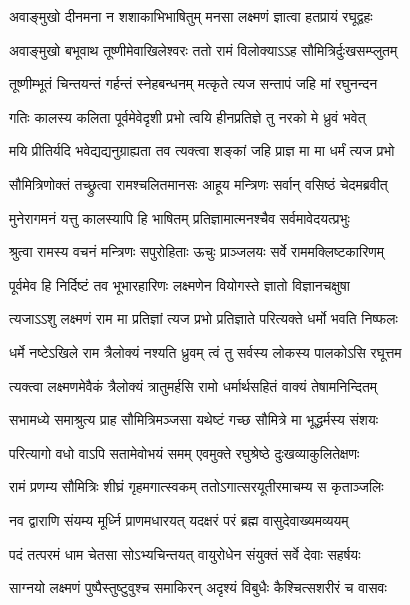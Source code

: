 \twolineshloka
{अवाङ्मुखो दीनमना न शशाकाभिभाषितुम्}
{मनसा लक्ष्मणं ज्ञात्वा हतप्रायं रघूद्वहः} %

\twolineshloka
{अवाङ्मुखो बभूवाथ तूष्णीमेवाखिलेश्वरः}
{ततो रामं विलोक्याऽऽह सौमित्रिर्दुःखसम्प्लुतम्} %

\twolineshloka
{तूष्णीम्भूतं चिन्तयन्तं गर्हन्तं स्नेहबन्धनम्}
{मत्कृते त्यज सन्तापं जहि मां रघुनन्दन} %

\twolineshloka
{गतिः कालस्य कलिता पूर्वमेवेदृशी प्रभो}
{त्वयि हीनप्रतिज्ञे तु नरको मे ध्रुवं भवेत्} %

\twolineshloka
{मयि प्रीतिर्यदि भवेद्यद्यनुग्राह्यता तव}
{त्यक्त्वा शङ्कां जहि प्राज्ञ मा मा धर्मं त्यज प्रभो} %

\twolineshloka
{सौमित्रिणोक्तं तच्छ्रुत्वा रामश्चलितमानसः}
{आहूय मन्त्रिणः सर्वान् वसिष्ठं चेदमब्रवीत्} %

\twolineshloka
{मुनेरागमनं यत्तु कालस्यापि हि भाषितम्}
{प्रतिज्ञामात्मनश्चैव सर्वमावेदयत्प्रभुः} %

\twolineshloka
{श्रुत्वा रामस्य वचनं मन्त्रिणः सपुरोहिताः}
{ऊचुः प्राञ्जलयः सर्वे राममक्लिष्टकारिणम्} %

\twolineshloka
{पूर्वमेव हि निर्दिष्टं तव भूभारहारिणः}
{लक्ष्मणेन वियोगस्ते ज्ञातो विज्ञानचक्षुषा} %

\twolineshloka
{त्यजाऽऽशु लक्ष्मणं राम मा प्रतिज्ञां त्यज प्रभो}
{प्रतिज्ञाते परित्यक्ते धर्मो भवति निष्फलः} %

\twolineshloka
{धर्मे नष्टेऽखिले राम त्रैलोक्यं नश्यति ध्रुवम्}
{त्वं तु सर्वस्य लोकस्य पालकोऽसि रघूत्तम} %

\twolineshloka
{त्यक्त्वा लक्ष्मणमेवैकं त्रैलोक्यं त्रातुमर्हसि}
{रामो धर्मार्थसहितं वाक्यं तेषामनिन्दितम्} %

\twolineshloka
{सभामध्ये समाश्रुत्य प्राह सौमित्रिमञ्जसा}
{यथेष्टं गच्छ सौमित्रे मा भूद्धर्मस्य संशयः} %

\twolineshloka
{परित्यागो वधो वाऽपि सतामेवोभयं समम्}
{एवमुक्ते रघुश्रेष्ठे दुःखव्याकुलितेक्षणः} %

\twolineshloka
{रामं प्रणम्य सौमित्रिः शीघ्रं गृहमगात्स्वकम्}
{ततोऽगात्सरयूतीरमाचम्य स कृताञ्जलिः} %

\twolineshloka
{नव द्वाराणि संयम्य मूर्ध्नि प्राणमधारयत्}
{यदक्षरं परं ब्रह्म वासुदेवाख्यमव्ययम्} %

\twolineshloka
{पदं तत्परमं धाम चेतसा सोऽभ्यचिन्तयत्}
{वायुरोधेन संयुक्तं सर्वे देवाः सहर्षयः} %

\twolineshloka
{साग्नयो लक्ष्मणं पुष्पैस्तुष्टुवुश्च समाकिरन्}
{अदृश्यं विबुधैः कैश्चित्सशरीरं च वासवः} %

